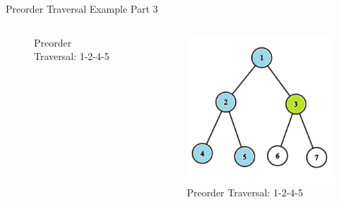 \documentclass[aspectratio=169]{beamer}%
\begin{document}
\begin{frame}{Preorder Traversal Example Part 3}
\begin{columns}
\begin{column}{0.32\textwidth}
\begin{figure}
                \caption{Preorder Traversal: 1-2-4-5}
            \end{figure}
        \end{column}
        \hfill
        \begin{column}{0.32\textwidth}
            \begin{figure}
                \centering
                \includegraphics[width = .9\linewidth]{tree-pre 9.png}
                \caption{Preorder Traversal: 1-2-4-5}
            \end{figure}
        \end{column}
    \end{columns}
\end{frame}
\end{document}
